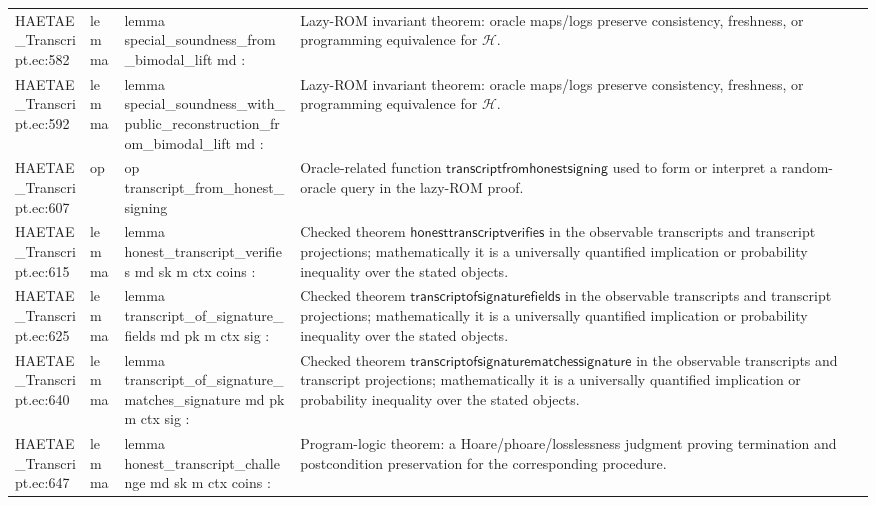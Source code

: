 \documentclass[10pt]{article}
\begin{document}
\begin{longtable}{L{0.11\textwidth}L{0.055\textwidth}L{0.385\textwidth}L{0.41\textwidth}}
HAETAE\_\allowbreak{}Transcript.\allowbreak{}ec:\allowbreak{}582 & lemma & {\ttfamily\scriptsize lemma special\_\allowbreak{}soundness\_\allowbreak{}from\_\allowbreak{}bimodal\_\allowbreak{}lift md :} & Lazy-ROM invariant theorem: oracle maps/logs preserve consistency, freshness, or programming equivalence for $\mathcal H$. \\
HAETAE\_\allowbreak{}Transcript.\allowbreak{}ec:\allowbreak{}592 & lemma & {\ttfamily\scriptsize lemma special\_\allowbreak{}soundness\_\allowbreak{}with\_\allowbreak{}public\_\allowbreak{}reconstruction\_\allowbreak{}from\_\allowbreak{}bimodal\_\allowbreak{}lift md :} & Lazy-ROM invariant theorem: oracle maps/logs preserve consistency, freshness, or programming equivalence for $\mathcal H$. \\
HAETAE\_\allowbreak{}Transcript.\allowbreak{}ec:\allowbreak{}607 & op & {\ttfamily\scriptsize op transcript\_\allowbreak{}from\_\allowbreak{}honest\_\allowbreak{}signing} & Oracle-related function $\mathsf{transcriptfromhonestsigning}$ used to form or interpret a random-oracle query in the lazy-ROM proof. \\
HAETAE\_\allowbreak{}Transcript.\allowbreak{}ec:\allowbreak{}615 & lemma & {\ttfamily\scriptsize lemma honest\_\allowbreak{}transcript\_\allowbreak{}verifies md sk m ctx coins :} & Checked theorem $\mathsf{honesttranscriptverifies}$ in the observable transcripts and transcript projections; mathematically it is a universally quantified implication or probability inequality over the stated objects. \\
HAETAE\_\allowbreak{}Transcript.\allowbreak{}ec:\allowbreak{}625 & lemma & {\ttfamily\scriptsize lemma transcript\_\allowbreak{}of\_\allowbreak{}signature\_\allowbreak{}fields md pk m ctx sig :} & Checked theorem $\mathsf{transcriptofsignaturefields}$ in the observable transcripts and transcript projections; mathematically it is a universally quantified implication or probability inequality over the stated objects. \\
HAETAE\_\allowbreak{}Transcript.\allowbreak{}ec:\allowbreak{}640 & lemma & {\ttfamily\scriptsize lemma transcript\_\allowbreak{}of\_\allowbreak{}signature\_\allowbreak{}matches\_\allowbreak{}signature md pk m ctx sig :} & Checked theorem $\mathsf{transcriptofsignaturematchessignature}$ in the observable transcripts and transcript projections; mathematically it is a universally quantified implication or probability inequality over the stated objects. \\
HAETAE\_\allowbreak{}Transcript.\allowbreak{}ec:\allowbreak{}647 & lemma & {\ttfamily\scriptsize lemma honest\_\allowbreak{}transcript\_\allowbreak{}challenge md sk m ctx coins :} & Program-logic theorem: a Hoare/phoare/losslessness judgment proving termination and postcondition preservation for the corresponding procedure. \\

\end{longtable}
\end{document}

